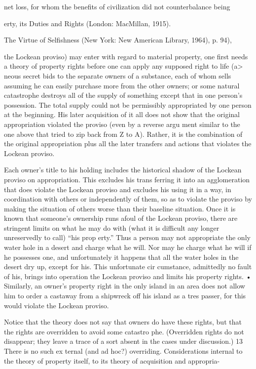 \documentclass[11pt,openany]{book}
\begin{document}
net loss, for whom the benefits of civilization did not counterbalance being 

erty, its Duties and Rights (London: MacMillan, 1915). 

The Virtue of Selfishness (New York: New American Library, 1964), p. 94), 

the Lockean proviso) may enter with regard to material property, one first needs a theory of property rights before one can apply any supposed right to life (a> neous secret bids to the separate owners of a substance, each of whom sells assuming he can easily purchase more from the other owners; or some natural catastrophe destroys all of the supply of something except that in one person's possession. The total supply could not be permissibly appropriated by one person at the beginning. His later acquisition of it all does not show that the original appropriation violated the proviso (even by a reverse argu ment similar to the one above that tried to zip back from Z to A). Rather, it is the combination of the original appropriation plus all the later transfers and actions that violates the Lockean proviso. 

Each owner's title to his holding includes the historical shadow of the Lockean proviso on appropriation. This excludes his trans ferring it into an agglomeration that does violate the Lockean proviso and excludes his using it in a way, in coordination with others or independently of them, so as to violate the proviso by making the situation of others worse than their baseline situation. Once it is known that someone's ownership runs afoul of the Lockean proviso, there are stringent limits on what he may do with (what it is difficult any longer unreservedly to call) ``his prop erty.'' Thus a person may not appropriate the only water hole in a desert and charge what he will. Nor may he charge what he will if he possesses one, and unfortunately it happens that all the water holes in the desert dry up, except for his. This unfortunate cir cumstance, admittedly no fault of his, brings into operation the Lockean proviso and limits his property rights. • Similarly, an owner's property right in the only island in an area does not allow him to order a castaway from a shipwreck off his island as a tres passer, for this would violate the Lockean proviso. 

Notice that the theory does not say that owners do have these rights, but that the rights are overridden to avoid some catastro phe. (Overridden rights do not disappear; they leave a trace of a sort absent in the cases under discussion.) 13 There is no such ex ternal (and ad hoc?) overriding. Considerations internal to the theory of property itself, to its theory of acquisition and appropria-
\end{document}
